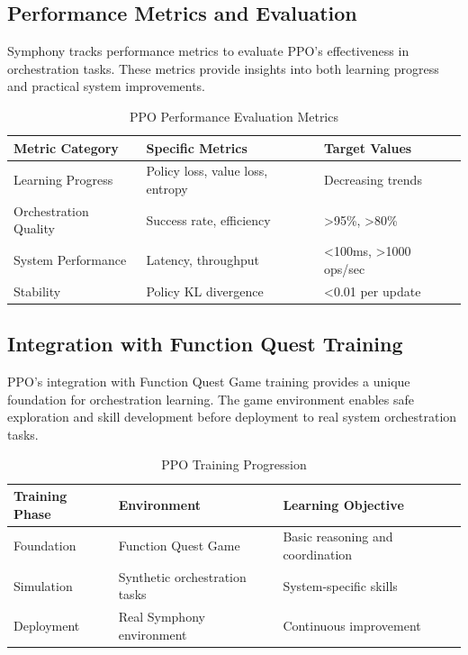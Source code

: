 \subsection*{Performance Metrics and Evaluation}

Symphony tracks performance metrics to evaluate PPO's effectiveness in orchestration tasks. These metrics provide insights into both learning progress and practical system improvements.

\begin{table}[ht]
\centering
\begin{tabular}{@{}lll@{}}
\toprule
\textbf{Metric Category} & \textbf{Specific Metrics} & \textbf{Target Values} \\
\midrule
Learning Progress & Policy loss, value loss, entropy & Decreasing trends \\
Orchestration Quality & Success rate, efficiency & >95\%, >80\% \\
System Performance & Latency, throughput & <100ms, >1000 ops/sec \\
Stability & Policy KL divergence & <0.01 per update \\
\bottomrule
\end{tabular}
\caption{PPO Performance Evaluation Metrics}
\end{table}

\subsection*{Integration with Function Quest Training}

PPO's integration with Function Quest Game training provides a unique foundation for orchestration learning. The game environment enables safe exploration and skill development before deployment to real system orchestration tasks.

\begin{table}[ht]
\centering
\begin{tabular}{@{}lll@{}}
\toprule
\textbf{Training Phase} & \textbf{Environment} & \textbf{Learning Objective} \\
\midrule
Foundation & Function Quest Game & Basic reasoning and coordination \\
Simulation & Synthetic orchestration tasks & System-specific skills \\
Deployment & Real Symphony environment & Continuous improvement \\
\bottomrule
\end{tabular}
\caption{PPO Training Progression}
\end{table}

